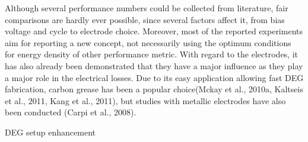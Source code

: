 	Although several performance numbers could be collected from literature, fair comparisons are hardly ever possible, since several factors affect it, from bias voltage and cycle to electrode choice. Moreover, most of the reported experiments aim for reporting a new concept, not necessarily using the optimum conditions for energy density of other performance metric.
	With regard to the electrodes, it has also already been demonstrated that they have a major influence as they play a major role in the electrical losses. Due to its easy application allowing fast DEG fabrication, carbon grease has been a popular choice(Mckay et al., 2010a, Kaltseis et al., 2011, Kang et al., 2011), but studies with metallic electrodes have also been conducted (Carpi et al., 2008). 

DEG setup enhancement

